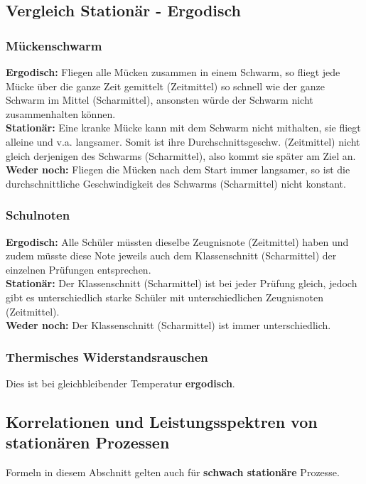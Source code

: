 \subsection{Vergleich Stationär - Ergodisch}
\subsubsection{Mückenschwarm}
\textbf{Ergodisch:} Fliegen alle Mücken zusammen in einem Schwarm, so fliegt jede Mücke über die
ganze Zeit gemittelt (Zeitmittel) so schnell wie der ganze Schwarm im Mittel (Scharmittel), ansonsten
würde der Schwarm nicht zusammenhalten können. \\
\textbf{Stationär:} Eine kranke Mücke kann mit dem Schwarm nicht mithalten, sie fliegt alleine und v.a. langsamer. Somit ist ihre Durchschnittsgeschw. (Zeitmittel) nicht gleich
derjenigen des Schwarms (Scharmittel), also kommt sie später am Ziel an. \\
\textbf{Weder noch:} Fliegen die Mücken nach dem Start immer langsamer, so ist die
durchschnittliche Geschwindigkeit des Schwarms (Scharmittel) nicht konstant.

\subsubsection{Schulnoten}
\textbf{Ergodisch:} Alle Schüler müssten dieselbe Zeugnisnote (Zeitmittel) haben und zudem müsste
diese Note jeweils auch dem Klassenschnitt (Scharmittel) der einzelnen Prüfungen entsprechen. \\
\textbf{Stationär:} Der Klassenschnitt (Scharmittel) ist bei jeder Prüfung gleich, jedoch gibt es
unterschiedlich starke Schüler mit unterschiedlichen Zeugnisnoten (Zeitmittel). \\
\textbf{Weder noch:} Der Klassenschnitt (Scharmittel) ist immer unterschiedlich.

\subsubsection{Thermisches Widerstandsrauschen} 
Dies ist bei gleichbleibender Temperatur \textbf{ergodisch}.


\subsection{Korrelationen und Leistungsspektren von stationären Prozessen }
Formeln in diesem Abschnitt gelten auch für \textbf{schwach stationäre} Prozesse. \\

